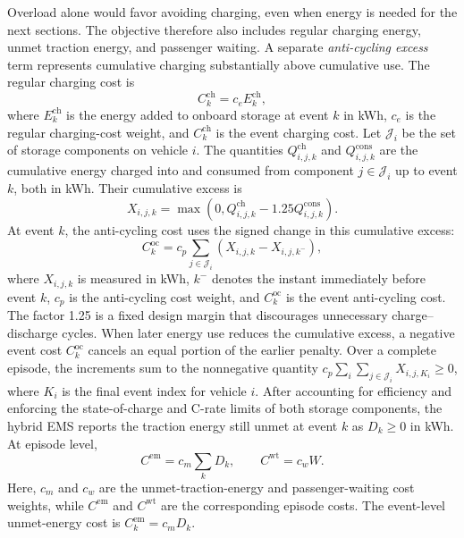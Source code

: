 \documentclass[conference]{IEEEtran}
\begin{document}
Overload alone would favor avoiding charging, even when energy is needed for the next sections. The objective therefore also includes regular charging energy, unmet traction energy, and passenger waiting. A separate \emph{anti-cycling excess} term represents cumulative charging substantially above cumulative use. The regular charging cost is
\begin{equation}
 C^{\mathrm{ch}}_k = c_e E^{\mathrm{ch}}_k,
\end{equation}
where $E^{\mathrm{ch}}_k$ is the energy added to onboard storage at event $k$ in kWh, $c_e$ is the regular charging-cost weight, and $C^{\mathrm{ch}}_k$ is the event charging cost. Let $\mathcal{J}_i$ be the set of storage components on vehicle $i$. The quantities $Q^{\mathrm{ch}}_{i,j,k}$ and $Q^{\mathrm{cons}}_{i,j,k}$ are the cumulative energy charged into and consumed from component $j\in\mathcal{J}_i$ up to event $k$, both in kWh. Their cumulative excess is
\begin{equation}
 X_{i,j,k}=\max\!\left(0,Q^{\mathrm{ch}}_{i,j,k}
 -1.25Q^{\mathrm{cons}}_{i,j,k}\right).
\end{equation}
At event $k$, the anti-cycling cost uses the signed change in this cumulative excess:
\begin{equation}
 C^{\mathrm{oc}}_k=c_p\sum_{j\in\mathcal{J}_i}
 \left(X_{i,j,k}-X_{i,j,k^-}\right),
\end{equation}
where $X_{i,j,k}$ is measured in kWh, $k^-$ denotes the instant immediately before event $k$, $c_p$ is the anti-cycling cost weight, and $C^{\mathrm{oc}}_k$ is the event anti-cycling cost. The factor 1.25 is a fixed design margin that discourages unnecessary charge--discharge cycles. When later energy use reduces the cumulative excess, a negative event cost $C^{\mathrm{oc}}_k$ cancels an equal portion of the earlier penalty. Over a complete episode, the increments sum to the nonnegative quantity $c_p\sum_i\sum_{j\in\mathcal{J}_i}X_{i,j,K_i}\geq0$, where $K_i$ is the final event index for vehicle $i$. After accounting for efficiency and enforcing the state-of-charge and C-rate limits of both storage components, the hybrid EMS reports the traction energy still unmet at event $k$ as $D_k\geq0$ in kWh. At episode level,
\begin{equation}
 C^{\mathrm{em}}=c_m\sum_kD_k,\qquad C^{\mathrm{wt}}=c_w W.
\end{equation}
Here, $c_m$ and $c_w$ are the unmet-traction-energy and passenger-waiting cost weights, while $C^{\mathrm{em}}$ and $C^{\mathrm{wt}}$ are the corresponding episode costs. The event-level unmet-energy cost is $C^{\mathrm{em}}_k=c_mD_k$.
\end{document}
